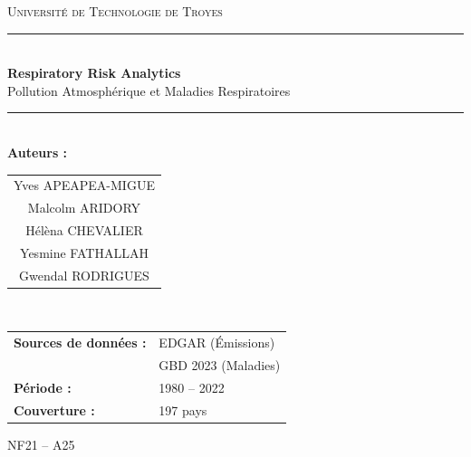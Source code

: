 \documentclass[11pt,a4paper]{article}
\begin{document}
\begin{titlepage}
    \centering
    \vspace*{1cm}

    {\Large\textsc{Université de Technologie de Troyes}}\\[0.3cm]

    \rule{\linewidth}{0.5mm}\\[0.4cm]
    {\Huge\bfseries Respiratory Risk Analytics}\\[0.2cm]
    {\Large Pollution Atmosphérique et Maladies Respiratoires}\\[0.3cm]
    \rule{\linewidth}{0.5mm}\\[1.5cm]

    {\large\textbf{Auteurs :}}\\[0.3cm]
    \begin{tabular}{c}
        Yves APEAPEA-MIGUE \\
        Malcolm ARIDORY \\
        Hélèna CHEVALIER \\
        Yesmine FATHALLAH \\
        Gwendal RODRIGUES \\
    \end{tabular}\\[1.5cm]

    \begin{tabular}{ll}
        \textbf{Sources de données :} & EDGAR (Émissions) \\
                                      & GBD 2023 (Maladies) \\[0.5cm]
        \textbf{Période :} & 1980 -- 2022 \\[0.5cm]
        \textbf{Couverture :} & 197 pays \\
    \end{tabular}

    \vfill
    {\large NF21 -- A25}
\end{titlepage}

\tableofcontents
\listoflistings
\newpage

\end{document}
